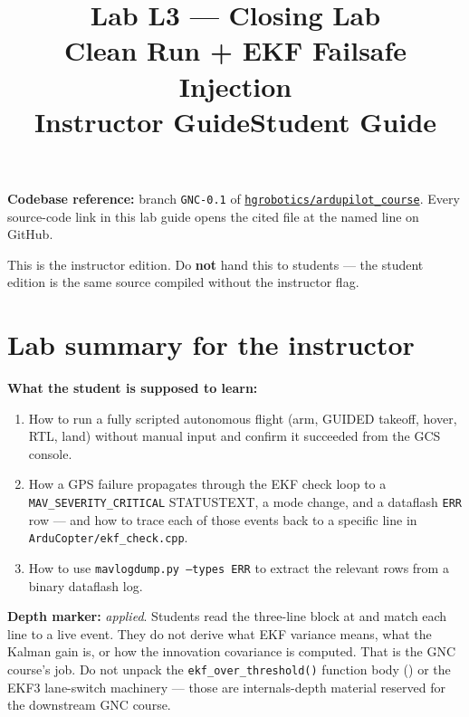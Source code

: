 \documentclass[a4paper,11pt,twoside]{article}
\title{Lab L3 --- Closing Lab\\
  \large Clean Run + EKF Failsafe Injection\\
  \large \ifinstructor Instructor Guide\else Student Guide\fi}
\author{\copyrightline}
\date{}
\begin{document}
\maketitle

\noindent\textbf{Codebase reference:} branch \texttt{GNC-0.1} of \href{\repourl}{\nolinkurl{hgrobotics/ardupilot_course}}. Every source-code link in this lab guide opens the cited file at the named line on GitHub.

\bigskip

\ifinstructor

\begin{tcolorbox}[colback=red!5!white,colframe=red!40!black,title=Instructor edition]
This is the instructor edition. Do \textbf{not} hand this to students --- the student edition is the same source compiled without the instructor flag.
\end{tcolorbox}

\section*{Lab summary for the instructor}

\textbf{What the student is supposed to learn:}
\begin{enumerate}
  \item How to run a fully scripted autonomous flight (arm, GUIDED takeoff, hover, RTL, land) without manual input and confirm it succeeded from the GCS console.
  \item How a GPS failure propagates through the EKF check loop to a \texttt{MAV\_SEVERITY\_CRITICAL} STATUSTEXT, a mode change, and a dataflash \texttt{ERR} row --- and how to trace each of those events back to a specific line in \texttt{ArduCopter/ekf\_check.cpp}.
  \item How to use \texttt{mavlogdump.py --types ERR} to extract the relevant rows from a binary dataflash log.
\end{enumerate}

\textbf{Depth marker:} \emph{applied}. Students read the three-line block at  and match each line to a live event. They do not derive what EKF variance means, what the Kalman gain is, or how the innovation covariance is computed. That is the GNC course's job. Do not unpack the \texttt{ekf\_over\_threshold()} function body () or the EKF3 lane-switch machinery --- those are internals-depth material reserved for the downstream GNC course.
\end{document}

